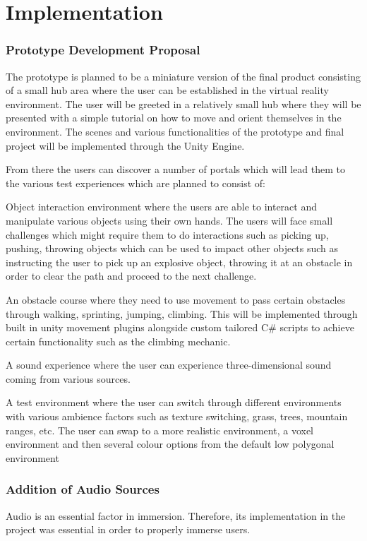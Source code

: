 \chapter{Implementation}

\subsection{Prototype Development Proposal}
The prototype is planned to be a miniature version of the final product consisting of a small hub area where the user can be established in the virtual reality environment. The user will be greeted in a relatively small hub where they will be presented with a simple tutorial on how to move and orient themselves in the environment. The scenes and various functionalities of the prototype and final project will be implemented through the Unity Engine. 

From there the users can discover a number of portals which will lead them to the various test experiences which are planned to consist of:  
 
Object interaction environment where the users are able to interact and manipulate various objects using their own hands. The users will face small challenges which might require them to do interactions such as picking up, pushing, throwing objects which can be used to impact other objects such as instructing the user to pick up an explosive object, throwing it at an obstacle in order to clear the path and proceed to the next challenge. 
 
An obstacle course where they need to use movement to pass certain obstacles through walking, sprinting, jumping, climbing. This will be implemented through built in unity movement plugins alongside custom tailored C# scripts to achieve certain functionality such as the climbing mechanic. 

A sound experience where the user can experience three-dimensional sound coming from various sources. 

A test environment where the user can switch through different environments with various ambience factors such as texture switching, grass, trees, mountain ranges, etc. The user can swap to a more realistic environment, a voxel environment and then several colour options from the default low polygonal environment 

\subsection{Addition of Audio Sources}
Audio is an essential factor in immersion. Therefore, its implementation in the project was essential in order to properly immerse users.


